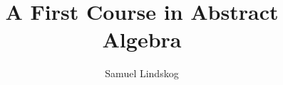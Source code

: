 \documentclass[nobib,notoc]{tufte-handout}
\begin{document}
\theoremstyle{definition}\newtheorem{defi}{Definition}[section]
\theoremstyle{definition}\newtheorem{thm}{Theorem}[section]
\theoremstyle{definition}\newtheorem{cor}{Corollary}[section]
\theoremstyle{definition}\newtheorem{lem}{Lemma}[section]
\theoremstyle{remark}\newtheorem*{notat}{Notation}
\theoremstyle{definition}\newtheorem{problem}{Problem}
\newenvironment{prob}[1]{\protect\setcounter{problem}{#1}\addtocounter{problem}{-1}\begin{problem}}{\end{problem}}

\title{A First Course in Abstract Algebra}
\author{Samuel Lindskog}
\maketitle

\setcounter{section}{1}
\setcounter{tocdepth}{1}
\end{document}
